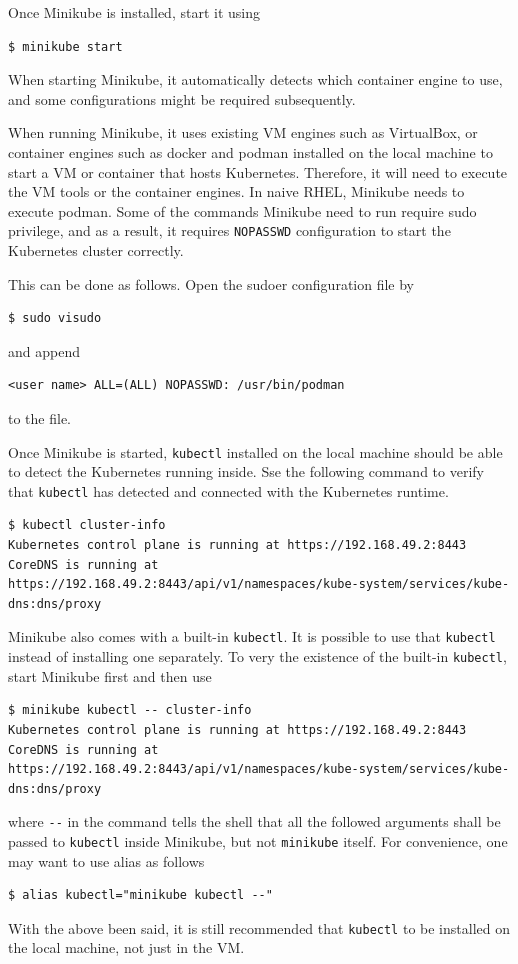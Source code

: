Once Minikube is installed, start it using
\begin{lstlisting}
$ minikube start
\end{lstlisting}
When starting Minikube, it automatically detects which container engine to use, and some configurations might be required subsequently.

When running Minikube, it uses existing VM engines such as VirtualBox, or container engines such as docker and podman installed on the local machine to start a VM or container that hosts Kubernetes. Therefore, it will need to execute the VM tools or the container engines. In naive RHEL, Minikube needs to execute podman. Some of the commands Minikube need to run require sudo privilege, and as a result, it requires \verb|NOPASSWD| configuration to start the Kubernetes cluster correctly. 

This can be done as follows. Open the sudoer configuration file by
\begin{lstlisting}
$ sudo visudo
\end{lstlisting}
and append
\begin{lstlisting}
<user name> ALL=(ALL) NOPASSWD: /usr/bin/podman
\end{lstlisting}
to the file.

Once Minikube is started, \verb|kubectl| installed on the local machine should be able to detect the Kubernetes running inside. Sse the following command to verify that \verb|kubectl| has detected and connected with the Kubernetes runtime.
\begin{lstlisting}
$ kubectl cluster-info
Kubernetes control plane is running at https://192.168.49.2:8443
CoreDNS is running at https://192.168.49.2:8443/api/v1/namespaces/kube-system/services/kube-dns:dns/proxy
\end{lstlisting}

\begin{shortbox}

Minikube also comes with a built-in \verb|kubectl|. It is possible to use that \verb|kubectl| instead of installing one separately. To very the existence of the built-in \verb|kubectl|, start Minikube first and then use

\begin{lstlisting}
$ minikube kubectl -- cluster-info
Kubernetes control plane is running at https://192.168.49.2:8443
CoreDNS is running at https://192.168.49.2:8443/api/v1/namespaces/kube-system/services/kube-dns:dns/proxy
\end{lstlisting}
where \verb|--| in the command tells the shell that all the followed arguments shall be passed to \verb|kubectl| inside Minikube, but not \verb|minikube| itself. For convenience, one may want to use alias as follows
\begin{lstlisting}
$ alias kubectl="minikube kubectl --"
\end{lstlisting}

With the above been said, it is still recommended that \verb|kubectl| to be installed on the local machine, not just in the VM. 
\end{shortbox}

